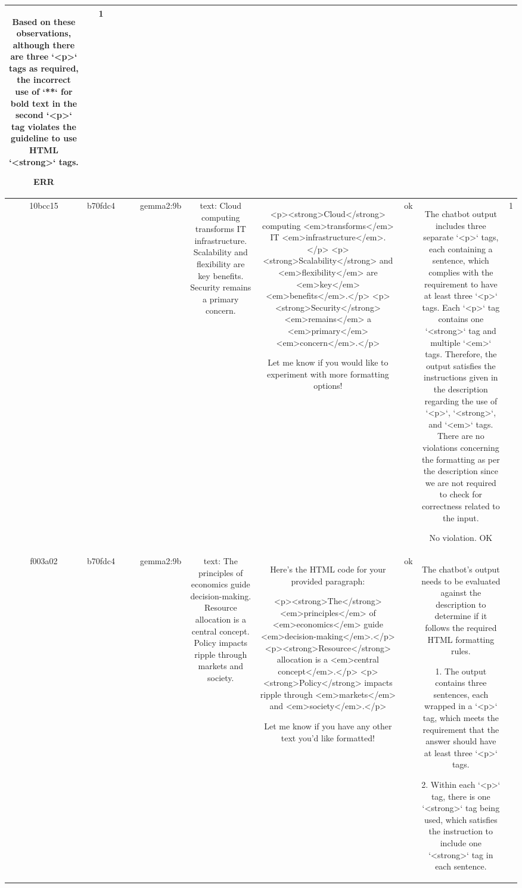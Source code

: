 \begin{table}[h!]
\begin{tabular}{|c|c|c|c|c|c|c|c|c|c|}
Based on these observations, although there are three `<p>` tags as required, the incorrect use of `**` for bold text in the second `<p>` tag violates the guideline to use HTML `<strong>` tags.

ERR & 1\\
\hline
10bcc15 & b70fdc4 &  &  & gemma2:9b & text: Cloud computing transforms IT infrastructure. Scalability and flexibility are key benefits. Security remains a primary concern. & <p><strong>Cloud</strong> computing <em>transforms</em> IT <em>infrastructure</em>. </p>
<p><strong>Scalability</strong> and <em>flexibility</em> are <em>key</em> <em>benefits</em>.</p>
<p><strong>Security</strong> <em>remains</em> a <em>primary</em> <em>concern</em>.</p> 


 Let me know if you would like to experiment with more formatting options! & ok & The chatbot output includes three separate `<p>` tags, each containing a sentence, which complies with the requirement to have at least three `<p>` tags. Each `<p>` tag contains one `<strong>` tag and multiple `<em>` tags. Therefore, the output satisfies the instructions given in the description regarding the use of `<p>`, `<strong>`, and `<em>` tags. There are no violations concerning the formatting as per the description since we are not required to check for correctness related to the input.

No violation.
OK & 1\\
\hline
f003a02 & b70fdc4 &  &  & gemma2:9b & text: The principles of economics guide decision-making. Resource allocation is a central concept. Policy impacts ripple through markets and society. & Here's the HTML code for your provided paragraph:

<p><strong>The</strong> <em>principles</em> of <em>economics</em> guide <em>decision-making</em>.</p>
<p><strong>Resource</strong> allocation is a <em>central concept</em>.</p>
<p><strong>Policy</strong> impacts ripple through <em>markets</em> and <em>society</em>.</p>


Let me know if you have any other text you'd like formatted! & ok & The chatbot's output needs to be evaluated against the description to determine if it follows the required HTML formatting rules.

1. The output contains three sentences, each wrapped in a `<p>` tag, which meets the requirement that the answer should have at least three `<p>` tags.

2. Within each `<p>` tag, there is one `<strong>` tag being used, which satisfies the instruction to include one `<strong>` tag in each sentence.


\end{tabular}
\end{table}
